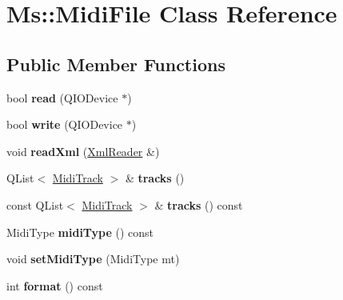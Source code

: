 \hypertarget{class_ms_1_1_midi_file}{}\section{Ms\+:\+:Midi\+File Class Reference}
\label{class_ms_1_1_midi_file}
\subsection*{Public Member Functions}
\begin{DoxyCompactItemize}
\item 
\mbox{\label{class_ms_1_1_midi_file_a8a1ac2ced9288846596cd5b2d18abe87}} 
bool {\bfseries read} (Q\+I\+O\+Device $\ast$)
\item 
\mbox{\label{class_ms_1_1_midi_file_a05ed269ba1eaa3070c82361869c77c0d}} 
bool {\bfseries write} (Q\+I\+O\+Device $\ast$)
\item 
\mbox{\label{class_ms_1_1_midi_file_aff5a5492ba4e9c184c57f1a835378eb9}} 
void {\bfseries read\+Xml} (\hyperlink{class_ms_1_1_xml_reader}{Xml\+Reader} \&)
\item 
\mbox{\label{class_ms_1_1_midi_file_af3e939f713ef81d7a229efc1f3c7dd74}} 
Q\+List$<$ \hyperlink{class_ms_1_1_midi_track}{Midi\+Track} $>$ \& {\bfseries tracks} ()
\item 
\mbox{\label{class_ms_1_1_midi_file_a52dc03c711059c39f85901bbefaa54b2}} 
const Q\+List$<$ \hyperlink{class_ms_1_1_midi_track}{Midi\+Track} $>$ \& {\bfseries tracks} () const
\item 
\mbox{\label{class_ms_1_1_midi_file_a616ff8d50202d4c26a5c4403b5dde85d}} 
Midi\+Type {\bfseries midi\+Type} () const
\item 
\mbox{\label{class_ms_1_1_midi_file_a2d55555f246ac838e8bfee9604402fda}} 
void {\bfseries set\+Midi\+Type} (Midi\+Type mt)
\item 
\mbox{\label{class_ms_1_1_midi_file_a4c63895c1dca70765690569705d6f2bf}} 
int {\bfseries format} () const
\item 

\end{DoxyCompactItemize}
